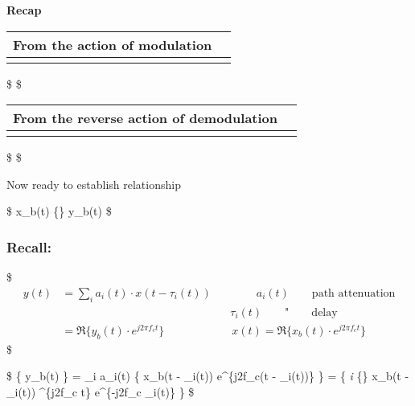 \documentclass[11pt]{article}
\begin{document}
{\textbf{Recap}

\begin{longtable}[]{@{}ll@{}}
\toprule\noalign{}
From the action of modulation & \\
\midrule\noalign{}
\endhead
\bottomrule\noalign{}
\endlastfoot
& \\
\end{longtable}

\$  \$ \textbar{} \textbar{}

\begin{longtable}[]{@{}ll@{}}
\toprule\noalign{}
From the reverse action of demodulation & \\
\midrule\noalign{}
\endhead
\bottomrule\noalign{}
\endlastfoot
& \\
\end{longtable}

\$  \$ \textbar{} \textbar{}

    Now ready to establish relationship

\$ x\_b(t) \xrightarrow{\qquad } \{\}
\xrightarrow{\qquad } y\_b(t) \$

\subsubsection{Recall:}\label{recall}

\$ \begin{align}
y(t) &= \sum\limits_i a_i(t) \cdot x(t - \tau_i(t)) \qquad \qquad a_i(t) \qquad \text{path attenuation} \\
& \qquad \qquad \qquad \qquad  \qquad \qquad \qquad \quad \tau_i(t) \qquad \text{"} \qquad  \text{delay} \\
&= \Re \{ y_b(t) \cdot e^{j2\pi f_c t} \}   \qquad \quad \qquad \quad x(t) = \Re \{ x_b(t) \cdot e^{j2\pi f_c t} \}
\end{align} \$

\$ \Rightarrow \Re \{ y\_b(t) \cdot {} \} =
\sum\limits\_i a\_i(t) \cdot \Re \Big\{ x\_b(t - \tau\_i(t))
\cdot e\^{}\{j2\pi f\_c(t - \tau\_i(t))\} \Big\} = \Re \left\{
\sum\limits\emph{i }\{\} \cdot x\_b(t -
\tau\_i(t)) \cdot {}\^{}\{j2\pi f\_c t\} \cdot e\^{}\{-j2\pi f\_c
\tau\_i(t)\} \right\} \$

}
\end{document}

